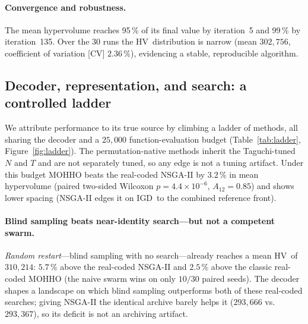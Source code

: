 \documentclass[runningheads]{llncs}
\newcommand{\HV}{\textsf{HV}}
\newcommand{\IGD}{\textsf{IGD}}
\begin{document}
\paragraph{Convergence and robustness.}
The mean hypervolume reaches 95\,\% of its final value by iteration~5 and 99\,\% by iteration~135. Over the 30 runs the \HV\ distribution is narrow (mean $302{,}756$, coefficient of variation [CV] $2.36\,\%$), evidencing a stable, reproducible algorithm.

\subsection{Decoder, representation, and search: a controlled ladder}
\label{sec:ablation}

We attribute performance to its true source by climbing a ladder of methods, all sharing the decoder and a $25{,}000$ function-evaluation budget (Table~\ref{tab:ladder}, Figure~\ref{fig:ladder}). The permutation-native methods inherit the Taguchi-tuned $N$ and $T$ and are not separately tuned, so any edge is not a tuning artifact. Under this budget MOHHO beats the real-coded NSGA-II by $3.2\,\%$ in mean hypervolume (paired two-sided Wilcoxon $p=4.4\times10^{-6}$, $A_{12}=0.85$) and shows lower spacing (NSGA-II edges it on \IGD\ to the combined reference front).

\paragraph{Blind sampling beats near-identity search---but not a competent swarm.}
\emph{Random restart}---blind sampling with no search---already reaches a mean \HV\ of $310{,}214$: $5.7\,\%$ above the real-coded NSGA-II and $2.5\,\%$ above the classic real-coded MOHHO (the naive swarm wins on only $10/30$ paired seeds). The decoder shapes a landscape on which blind sampling outperforms both of these real-coded searches; giving NSGA-II the identical archive barely helps it ($293{,}666$ vs.\ $293{,}367$), so its deficit is not an archiving artifact.
\end{document}
